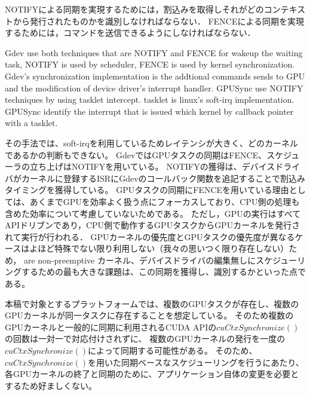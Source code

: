 NOTIFYによる同期を実現するためには，割込みを取得しそれがどのコンテキストから発行されたものかを識別しなければならない．
FENCEによる同期を実現するためには，コマンドを送信できるようにしなければならない．

Gdev use both techniques that are NOTIFY and FENCE for wakeup the waiting task, NOTIFY is used by scheduler, FENCE is used by kernel synchronization.
Gdev's synchronization implementation is the addtional commands sends to GPU and the modification of device driver's interrupt handler.
GPUSync use NOTIFY techniques by using tasklet intercept. 
tasklet is linux's soft-irq implementation.
GPUSync identify the interrupt that is issued which kernel by callback pointer with a tasklet.



その手法では、soft-irqを利用しているためレイテンシが大きく、どのカーネルであるかの判断もできない。
GdevではGPUタスクの同期はFENCE、スケジューラの立ち上げはNOTIFYを用いている。
NOTIFYの獲得は、デバイスドライバがカーネルに登録するISRにGdevのコールバック関数を追記することで割込みタイミングを獲得している。
GPUタスクの同期にFENCEを用いている理由としては、あくまでGPUを効率よく扱う点にフォーカスしており、CPU側の処理も含めた効率について考慮していないためである。
ただし，GPUの実行はすべてAPIドリブンであり，CPU側で動作するGPUタスクからGPUカーネルを発行されて実行が行われる．
GPUカーネルの優先度とGPUタスクの優先度が異なるケースはよほど特殊でない限り利用しない（我々の思いつく限り存在しない）ため，
are non-preemptive
カーネル、デバイスドライバの編集無しにスケジューリングするための最も大きな課題は、この同期を獲得し、識別するかといった点である。
\fi

本稿で対象とするプラットフォームでは、複数のGPUタスクが存在し、複数のGPUカーネルが同一タスクに存在することを想定している。
そのため複数のGPUカーネルと一般的に同期に利用されるCUDA APIの$cuCtxSynchronize()$の回数は一対一で対応付けされずに、
複数のGPUカーネルの発行を一度の$cuCtxSynchronize()$によって同期する可能性がある。
そのため、$cuCtxSynchronize()$を用いた同期ベースなスケジューリングを行うにあたり、各GPUカーネルの終了と同期のために、アプリケーション自体の変更を必要とするため好ましくない。

